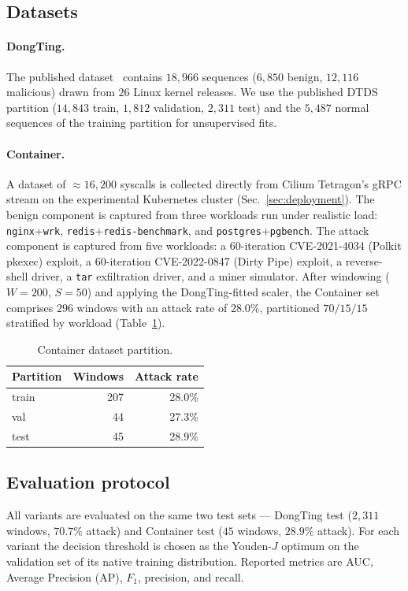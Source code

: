 \subsection{Datasets}
\label{subsec:datasets}

\paragraph{DongTing.}
The published dataset~\cite{dongting} contains $18{,}966$ sequences
($6{,}850$ benign, $12{,}116$ malicious) drawn from $26$ Linux kernel
releases. We use the published DTDS partition ($14{,}843$ train,
$1{,}812$ validation, $2{,}311$ test) and the $5{,}487$ normal
sequences of the training partition for unsupervised fits.

\paragraph{Container.}
A dataset of $\approx\!16{,}200$ syscalls is collected directly from
Cilium Tetragon's gRPC stream on the experimental Kubernetes cluster
(Sec.~\ref{sec:deployment}). The benign component is captured from
three workloads run under realistic load: \texttt{nginx}+\texttt{wrk},
\texttt{redis}+\texttt{redis-benchmark}, and
\texttt{postgres}+\texttt{pgbench}. The attack component is captured
from five workloads: a $60$-iteration CVE-2021-4034 (Polkit pkexec)
exploit, a $60$-iteration CVE-2022-0847 (Dirty Pipe) exploit, a
reverse-shell driver, a \texttt{tar} exfiltration driver, and a miner
simulator. After windowing ($W=200$, $S=50$) and applying the
DongTing-fitted scaler, the Container set comprises $296$ windows with
an attack rate of $28.0\%$, partitioned $70/15/15$ stratified by
workload (Table~\ref{tab:dataset_summary}).

\begin{table}[!t]
\centering
\caption{Container dataset partition.}
\label{tab:dataset_summary}
\begin{tabular}{lrr}
\toprule
Partition & Windows & Attack rate \\
\midrule
train  & 207  & 28.0\% \\
val    & 44   & 27.3\% \\
test   & 45   & 28.9\% \\
\bottomrule
\end{tabular}
\end{table}

\subsection{Evaluation protocol}
All variants are evaluated on the same two test sets --- DongTing
test ($2{,}311$ windows, $70.7\%$ attack) and Container test
($45$ windows, $28.9\%$ attack). For each variant the decision
threshold is chosen as the Youden-$J$ optimum on the validation set
of its native training distribution. Reported metrics are AUC,
Average Precision (AP), $F_{1}$, precision, and recall.

